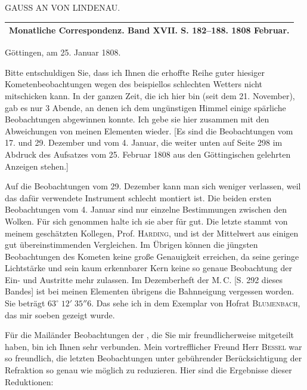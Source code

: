 \clearpage
{}
\hypertarget{native-301-lower}{}
\begin{center}GAUSS AN VON LINDENAU.
\end{center}

\begin{center}
\begin{tabular}{c}
\hline
Monatliche Correspondenz. Band XVII. S. 182--188. 1808 Februar.\\
\hline
\end{tabular}
\end{center}

\begin{flushright}
Göttingen, am 25. Januar 1808.
\end{flushright}

Bitte entschuldigen Sie, dass ich Ihnen die erhoffte Reihe guter hiesiger Kometenbeobachtungen wegen des beispiellos schlechten Wetters nicht mitschicken kann. In der ganzen Zeit, die ich hier bin (seit dem 21. November), gab es nur 3 Abende, an denen ich dem ungünstigen Himmel einige spärliche Beobachtungen abgewinnen konnte. Ich gebe sie hier zusammen mit den Abweichungen von meinen Elementen wieder. [Es sind die Beobachtungen vom 17. und 29. Dezember und vom 4. Januar, die weiter unten auf Seite 298 im Abdruck des Aufsatzes vom 25. Februar 1808 aus den Göttingischen gelehrten Anzeigen stehen.]

\par\indent Auf die Beobachtungen vom 29. Dezember kann man sich weniger verlassen, weil das dafür verwendete Instrument schlecht montiert ist. Die beiden ersten Beobachtungen vom 4. Januar sind nur einzelne Bestimmungen zwischen den Wolken. Für sich genommen halte ich sie aber für gut. Die letzte stammt von meinem geschätzten Kollegen, Prof. \textsc{Harding}, und ist der Mittelwert aus einigen gut übereinstimmenden Vergleichen. Im Übrigen können die jüngsten Beobachtungen des Kometen keine große Genauigkeit erreichen, da seine geringe Lichtstärke und sein kaum erkennbarer Kern keine so genaue Beobachtung der Ein- und Austritte mehr zulassen. Im Dezemberheft der M.\,C. [S. 292 dieses Bandes] ist bei meinen Elementen übrigens die Bahnneigung vergessen worden. Sie beträgt $63^\circ\;12'\;35''6$. Das sehe ich in dem Exemplar von Hofrat \textsc{Blumenbach}, das mir soeben gezeigt wurde.

\par\indent Für die Mailänder Beobachtungen der \VestaAltarThreeOhOne{}, die Sie mir freundlicherweise mitgeteilt haben, bin ich Ihnen sehr verbunden. Mein vortrefflicher Freund Herr \textsc{Bessel} war so freundlich, die letzten Beobachtungen unter gebührender Berücksichtigung der Refraktion so genau wie möglich zu reduzieren. Hier sind die Ergebnisse dieser Reduktionen:


